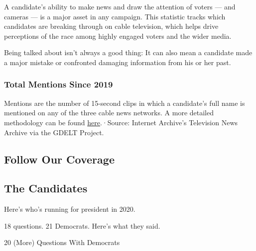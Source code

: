 A candidate's ability to make news and draw the attention of voters ---
and cameras --- is a major asset in any campaign. This statistic tracks
which candidates are breaking through on cable television, which helps
drive perceptions of the race among highly engaged voters and the wider
media.

Being talked about isn't always a good thing: It can also mean a
candidate made a major mistake or confronted damaging information from
his or her past.

\hypertarget{total-mentions-since-2019}{%
\subsubsection{Total Mentions Since
2019}\label{total-mentions-since-2019}}

Mentions are the number of 15-second clips in which a candidate's full
name is mentioned on any of the three cable news networks. A more
detailed methodology can be found
\href{https://blog.gdeltproject.org/the-new-television-explorer-launches/}{here}.·Source:
Internet Archive's Television News Archive via the GDELT Project.

\hypertarget{follow-our-coverage}{%
\subsection{Follow Our Coverage}\label{follow-our-coverage}}

\href{https://www.nytimes.com/interactive/2019/us/politics/2020-presidential-candidates.html}{}

\hypertarget{the-candidates}{%
\subsection{The Candidates}\label{the-candidates}}

Here's who's running for president in 2020.

\href{https://www.nytimes.com/interactive/2019/us/politics/2020-candidate-interviews.html}{}

18 questions. 21 Democrats. Here's what they said.

\href{https://www.nytimes.com/interactive/2020/us/politics/democratic-candidates-20-questions.html}{}

20 (More) Questions With Democrats

\href{https://www.nytimes.com/interactive/2020/us/elections/delegate-count-primary-results.html}{}

